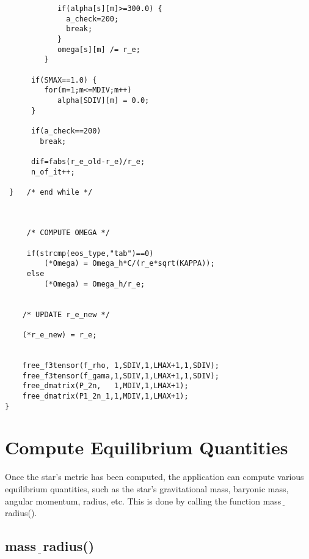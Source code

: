\begin{verbatim}
            if(alpha[s][m]>=300.0) {
              a_check=200; 
              break;
            }
            omega[s][m] /= r_e;
         } 

      if(SMAX==1.0) {
         for(m=1;m<=MDIV;m++)      
            alpha[SDIV][m] = 0.0;
      }

      if(a_check==200)
        break;

      dif=fabs(r_e_old-r_e)/r_e;
      n_of_it++;

 }   /* end while */



     /* COMPUTE OMEGA */  

     if(strcmp(eos_type,"tab")==0) 
         (*Omega) = Omega_h*C/(r_e*sqrt(KAPPA));
     else
         (*Omega) = Omega_h/r_e;


    /* UPDATE r_e_new */

    (*r_e_new) = r_e;
  

    free_f3tensor(f_rho, 1,SDIV,1,LMAX+1,1,SDIV);
    free_f3tensor(f_gama,1,SDIV,1,LMAX+1,1,SDIV);
    free_dmatrix(P_2n,   1,MDIV,1,LMAX+1);   
    free_dmatrix(P1_2n_1,1,MDIV,1,LMAX+1);  
}

\end{verbatim}

\section{Compute Equilibrium Quantities}

Once the star's metric has been computed, the application can
compute various equilibrium quantities, such as the star's 
gravitational mass,
baryonic mass, angular momentum, radius, etc. This is 
done by calling the function mass$\underline{\;\;}$radius().

\subsection{mass$\underline{\;\;}$radius()}

